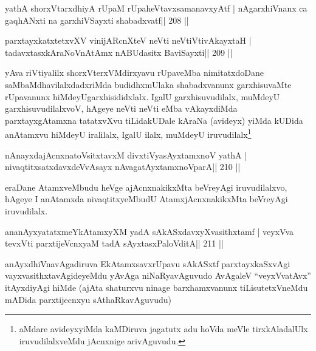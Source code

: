 
\begin{shl}
yathA shorxVtarxdhiyA rUpaM rUpaheVtavxsamanavxyAtf |
nAgarxhiVnanx ca gaqhANxti na garxhiVSayxti shabadxvatf\hfill || 208 ||
\end{shl}

\begin{shl}
parxtayxkatxtetxvXV vinijARcnXteV neVti neVtiVtivAkayxtaH |
tadavxtasxkAraNoV\s nAtAmx nABUdasitx BaviSayxti\hfill || 209 ||
\end{shl}

\begin{artha}
yAva riVtiyalilx shorxVterxVMdirxyavu rUpaveMba nimitatxdoDane
saMbaMdhavilalxdadxriMda budidhxmUlaka shabadxvanunx garxhisuvaMte
rUpavanunx hiMdeyU\break garxhisididxlalx. IgalU garxhisuvudilalx, muMdeyU
garxhisuvudilalxvoV, hAgeye neVti neVti eMba vAkayxdiMda
parxtayxgAtamxna tatatxvXvu tiLidakUDale kAraNa (avideyx) yiMda kUDida
anAtamxvu hiMdeyU iralilalx, IgalU ilalx, muMdeyU
iruvudilalx\footnote{aMdare avideyxyiMda kaMDiruva jagatutx adu
  hoVda meVle tirxkAladalUlx iruvudilalxveMdu jAcnxnige arivAguvudu.}
\end{artha}  
  

\begin{shl}
nAnayxdajAcnxnatoV\s sitxtavxM divxtiVyasAyx\s\s tamxnoV yathA |
nivaqtitxsatxdavxdeVvAsayx nAvagatAyxtamxnoV\s parA\hfill || 210 ||
\end{shl}

\begin{artha}
eraDane AtamxveMbudu heVge ajAcnxnakikxMta beVreyAgi iruvudilalxvo, hAgeye I anAtamxda nivaqtitxyeMbudU AtamxjAcnxnakikxMta beVreyAgi iruvudilalx.
\end{artha}


\begin{shl}
ananAyxyatatxmeYkAtamxyXM yadA sAkASxdavxyXvasithxtamf |
veyxVva tevxVti parxtijeVcnxyaM tadA sAyxtasxPaloVditA\hfill || 211 ||
\end{shl}

\begin{artha}
anAyxdhiVnavAgadiruva EkAtamxsavxrUpavu sAkASxtf parxtayxkaSxvAgi
vayxvasithxtavAgideyeMdu yAvAga niNaRyavAguvudo AvAgaleV
``veyxVvatAvx'' itAyxdiyAgi hiMde (ajAta shaturxvu ninage
barxhamxvanunx tiLisutetxVneMdu mADida parxtijecnxyu sAthaRkavAguvudu)
\end{artha}

